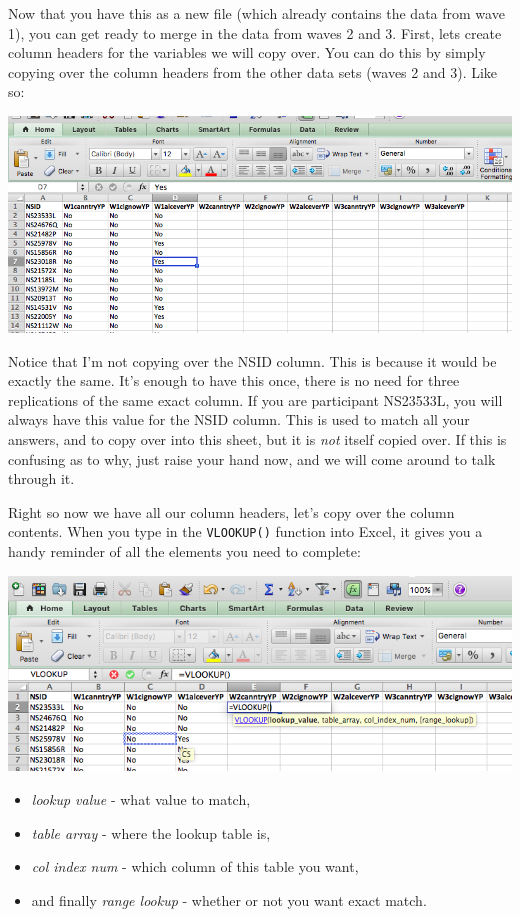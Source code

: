 \documentclass[
]{book}
\providecommand{\tightlist}{%
  \setlength{\itemsep}{0pt}\setlength{\parskip}{0pt}}
\begin{document}
Now that you have this as a new file (which already contains the data from wave 1), you can get ready to merge in the data from waves 2 and 3. First, lets create column headers for the variables we will copy over. You can do this by simply copying over the column headers from the other data sets (waves 2 and 3). Like so:

\includegraphics{imgs/merge_copy_headers.png}

Notice that I'm not copying over the NSID column. This is because it would be exactly the same. It's enough to have this once, there is no need for three replications of the same exact column. If you are participant NS23533L, you will always have this value for the NSID column. This is used to match all your answers, and to copy over into this sheet, but it is \emph{not} itself copied over. If this is confusing as to why, just raise your hand now, and we will come around to talk through it.

Right so now we have all our column headers, let's copy over the column contents. When you type in the \texttt{VLOOKUP()} function into Excel, it gives you a handy reminder of all the elements you need to complete:

\includegraphics{imgs/vlookup_hints.png}

\begin{itemize}
\tightlist
\item
  \emph{lookup value} - what value to match,
\item
  \emph{table array} - where the lookup table is,
\item
  \emph{col index num} - which column of this table you want,
\item
  and finally \emph{range lookup} - whether or not you want exact match.
\end{itemize}
\end{document}
